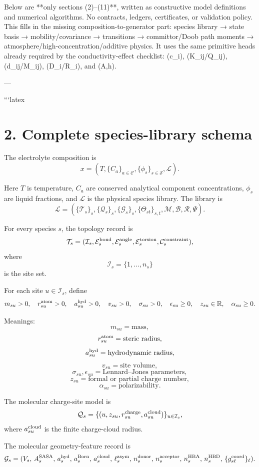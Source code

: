 Below are **only sections (2)–(11)**, written as constructive model definitions and numerical algorithms. No contracts, ledgers, certificates, or validation policy. This fills in the missing composition-to-generator part: species library → state basis → mobility/covariance → transitions → committor/Doob path moments → atmosphere/high-concentration/additive physics. It uses the same primitive heads already required by the conductivity-effect checklist: (c_i), (K_{ij}/Q_{ij}), (d_{ij}/M_{ij}), (D_i/R_i), and (A,h). 

---

```latex
\section{2. Complete species-library schema}

The electrolyte composition is
\[
x=(T,\{C_a\}_{a\in\mathcal C},\{\phi_s\}_{s\in\mathcal S},\mathcal L).
\]

Here \(T\) is temperature, \(C_a\) are conserved analytical component concentrations,
\(\phi_s\) are liquid fractions, and \(\mathcal L\) is the physical species library.
The library is
\[
\mathcal L=
\left(
\{\mathcal T_s\}_{s},
\{\mathcal Q_s\}_{s},
\{\mathcal G_s\}_{s},
\{\Theta_{st}\}_{s,t},
\mathcal M,
\mathcal B,
\mathcal R,
\mathcal \Psi
\right).
\]

For every species \(s\), the topology record is
\[
\mathcal T_s
=
(\mathcal I_s,\mathcal E_s^{\rm bond},\mathcal E_s^{\rm angle},
\mathcal E_s^{\rm torsion},\mathcal C_s^{\rm constraint}),
\]
where
\[
\mathcal I_s=\{1,\ldots,n_s\}
\]
is the site set.

For each site \(u\in\mathcal I_s\), define
\[
m_{su}>0,
\quad
r_{su}^{\rm atom}>0,
\quad
a_{su}^{\rm hyd}>0,
\quad
v_{su}>0,
\quad
\sigma_{su}>0,
\quad
\epsilon_{su}\ge0,
\quad
z_{su}\in\mathbb R,
\quad
\alpha_{su}\ge0.
\]

Meanings:
\[
m_{su}=\text{mass},
\]
\[
r_{su}^{\rm atom}=\text{steric radius},
\]
\[
a_{su}^{\rm hyd}=\text{hydrodynamic radius},
\]
\[
v_{su}=\text{site volume},
\]
\[
\sigma_{su},\epsilon_{su}=\text{Lennard--Jones parameters},
\]
\[
z_{su}=\text{formal or partial charge number},
\]
\[
\alpha_{su}=\text{polarizability}.
\]

The molecular charge-site model is
\[
\mathcal Q_s=\{(u,z_{su},r_{su}^{\rm charge},a_{su}^{\rm cloud})\}_{u\in\mathcal I_s},
\]
where \(a_{su}^{\rm cloud}\) is the finite charge-cloud radius.

The molecular geometry-feature record is
\[
\mathcal G_s=
(
V_s,\,
A_s^{\rm SASA},\,
a_s^{\rm hyd},\,
a_s^{\rm Born},\,
a_s^{\rm cloud},\,
\ell_s^{\rm asym},\,
n_s^{\rm donor},\,
n_s^{\rm acceptor},\,
n_s^{\rm HBA},\,
n_s^{\rm HBD},\,
\{g_{s\ell}^{\rm coord}\}_{\ell}
).
\]

